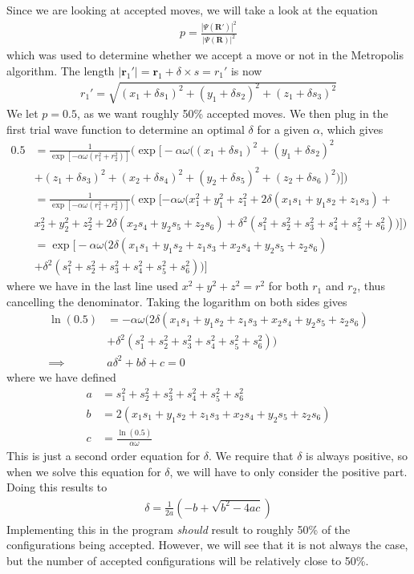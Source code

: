 \documentclass[12pt]{article}
\begin{document}
Since we are looking at accepted moves, we will take a look at the equation
\begin{align*}
p = \frac{|\Psi(\mathbf{R'})|^2}{|\Psi(\mathbf{R})|^2}
\end{align*}
which was used to determine whether we accept a move or not in the Metropolis algorithm. The length $|\mathbf{r}_1'| = \mathbf{r}_1 + \delta \times s = r_1'$ is now
\begin{align*}
r_1' = \sqrt{(x_1 + \delta s_1)^2 + (y_1 + \delta s_2)^2 + (z_1 + \delta s_3)^2}
\end{align*} We let $p = 0.5$, as we want roughly 50\% accepted moves. We then plug in the first trial wave function to determine an optimal $\delta$ for a given $\alpha$, which gives
\begin{align*}
0.5 &= \frac{1}{\exp\left[-\alpha \omega(r_1^2+r_2^2) \right]} \big(\exp\big[-\alpha \omega \big((x_1 + \delta s_1)^2 + (y_1 + \delta s_2)^2  \\
& + (z_1 + \delta s_3)^2 + (x_2 + \delta s_4)^2 + (y_2 + \delta s_5)^2 + (z_2 + \delta s_6)^2\big)\big]\big) \\
&= \frac{1}{\exp[-\alpha \omega (r_1^2 + r_2^2)]}\big(\exp[-\alpha \omega\big(x_1^2 + y_1^2 + z_1^2 + 2\delta(x_1s_1 + y_1s_2 + z_1s_3) + \\
& x_2^2 + y_2^2 + z_2^2 + 2\delta(x_2s_4 + y_2s_5 + z_2 s_6) +\delta^2(s_1^2 + s_2^2 + s_3^2 + s_4^2 + s_5^2 + s_6^2) \big)]  \big) \\
&= \exp\big[-\alpha \omega\big(2\delta(x_1s_1 + y_1s_2 + z _1s_3 + x_2s_4 + y_2s_5 + z_2 s_6) \\
& +\delta^2(s_1^2 + s_2^2 + s_3^2 + s_4^2 + s_5^2 + s_6^2) \big) \big]
\end{align*}
where we have in the last line used  $x^2 + y^2 + z^2 = r^2$ for both $r_1$ and $r_2$, thus cancelling the denominator. Taking the logarithm on both sides gives
\begin{align*}
\ln(0.5) &= -\alpha \omega\big(2\delta(x_1s_1 + y_1s_2 + z _1s_3 + x_2s_4 + y_2s_5 + z_2 s_6) \\
& +\delta^2(s_1^2 + s_2^2 + s_3^2 + s_4^2 + s_5^2 + s_6^2) \big) \\
\implies & a\delta^2 + b\delta + c = 0
\end{align*}
where we have defined
\begin{align*}
a &= s_1^2 + s_2^2 + s_3^2 + s_4^2 + s_5^2 + s_6^2 \\
b &= 2(x_1s_1 + y_1s_2 + z _1s_3 + x_2s_4 + y_2s_5 + z_2 s_6) \\
c &= \frac{\ln(0.5)}{\alpha \omega}
\end{align*}
This is just a second order equation for $\delta$. We require that $\delta$ is always positive, so when we solve this equation for $\delta$, we will have to only consider the positive part. Doing this results to
\begin{align}
\delta = \frac{1}{2a}(-b + \sqrt{b^2 - 4ac})
\label{eq:step_length_algo}
\end{align}
Implementing this in the program \emph{should} result to roughly 50\% of the configurations being accepted. However, we will see that it is not always the case, but the number of accepted configurations will be relatively close to 50\%.
\end{document}
